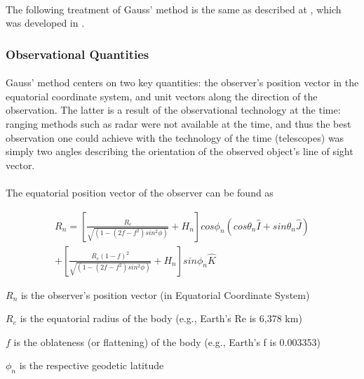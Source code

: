 \documentclass[11pt,twoside,letterpaper]{article}
\begin{document}
  \paragraph{}
  The following treatment of Gauss' method is the same as described at
  \cite{Wikipedia_2018}, which was developed in \cite{curtis_2014}.

  \subsubsection {Observational Quantities}
  \paragraph{}
  Gauss' method centers on two key quantities: the observer's position
  vector in the equatorial coordinate system, and unit vectors along
  the direction of the observation. The latter is a result of the
  observational technology at the time: ranging methods such as radar
  were not available at the time, and thus the best observation one
  could achieve with the technology of the time (telescopes) was
  simply two angles describing the orientation of the observed
  object's line of sight vector. 

  \paragraph{}
  The equatorial position vector of the observer can be found as
 

  \begin{equation}
    \begin{split}
      R_n =
      \left[
        \frac{R_e}{\sqrt{(1 - (2f -f^2)sin^2\phi)}} + H_n
        \right]cos\phi_n(cos\theta_n\hat{I} + sin\theta_n\hat{J}) \\+
      \left[
        \frac{R_e(1 - f)^2}{\sqrt{(1 - (2f -f^2)sin^2\phi)}} + H_n
        \right]sin\phi_n\hat{K}
    \end{split}
  \end{equation}

  \(R_n\) is the observer's position vector (in Equatorial Coordinate System)
  
  \(R_e\) is the equatorial radius of the body (e.g., Earth's Re is 6,378 km)
  
  \(f\) is the oblateness (or flattening) of the body (e.g., Earth's f is 0.003353)
  
  \(\phi_n\) is the respective geodetic latitude
  
\end{document}
